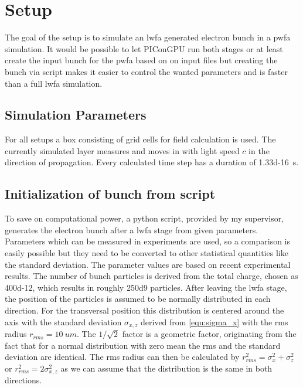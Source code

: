 \documentclass[bachelor_thesis]{subfiles}
\begin{document}
\chapter{Setup}
The goal of the setup is to simulate an \gls{lwfa} generated electron bunch in a \gls{pwfa} simulation. It would be possible to let PIConGPU run both stages or at least create the input bunch for the \gls{pwfa} based on on input files
but creating the bunch via script makes it easier to control the wanted parameters and is faster than a full \gls{lwfa} simulation. 



\section{Simulation Parameters}
For all setups a box consisting of  grid cells for field calculation is used. The currently simulated layer measures  and moves in with light speed $c$ in the direction of propagation.
Every calculated time step has a duration of \qty{1.33d-16}{\s}. 


\section{Initialization of bunch from script}\label{chap:init}
To save on computational power, a python script, provided by my supervisor, generates the electron bunch after a \gls{lwfa} stage from given parameters. Parameters which can be measured in experiments are used,
so a comparison is easily possible but they need to be converted to other statistical quantities like the standard deviation. The parameter values are based on recent experimental results\cite{Kurz2021, Schoebel2022, Cabadag2021}.
The number of bunch particles is derived from the total charge, chosen as \qty{400d-12}{\C}, which results in roughly \num{250d9} particles. After leaving the \gls{lwfa} stage, the position of the particles is assumed to be normally distributed in each direction.
For the transversal position this distribution is centered around the axis with the standard deviation $\sigma_{x,z}$ derived from \autoref{equ:sigma_x} with the \gls{rms} radius $r_{rms}=\qty{10}{um}$.
The $1/\sqrt{2}$ factor is a geometric factor, originating from the fact that for a normal distribution with zero mean the \gls{rms} and the standard deviation are identical. 
The \gls{rms} radius can then be calculated by $r_{rms}^2=\sigma_{x}^2 + \sigma_{z}^2$ or  $r_{rms}^2=2\sigma_{x,z}^2$ as we can assume that the distribution is the same in both directions.
\end{document}

